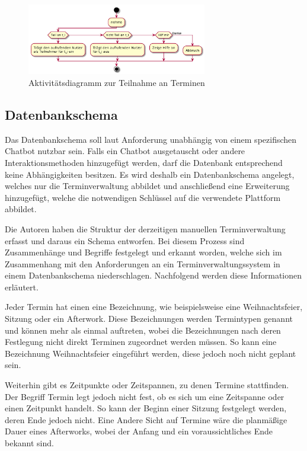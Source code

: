 \begin{figure}[htbp]
    \centering
    \includegraphics[width=0.7\textwidth]{../docs/uml/activity-teilnahme.png}
    \caption{Aktivitätsdiagramm zur Teilnahme an Terminen}
    \label{img:activity-teilnahme}
\end{figure}


\subsection{Datenbankschema}

Das Datenbankschema soll laut Anforderung unabhängig von einem spezifischen Chatbot nutzbar sein. Falls ein Chatbot ausgetauscht oder andere Interaktionsmethoden hinzugefügt werden, darf die Datenbank entsprechend keine Abhängigkeiten besitzen. Es wird deshalb ein Datenbankschema angelegt, welches nur die Terminverwaltung abbildet und anschließend eine Erweiterung hinzugefügt, welche die notwendigen Schlüssel auf die verwendete Plattform abbildet.

Die Autoren haben die Struktur der derzeitigen manuellen Terminverwaltung erfasst und daraus ein Schema entworfen. Bei diesem Prozess sind Zusammenhänge und Begriffe festgelegt und erkannt worden, welche sich im Zusammenhang mit den Anforderungen an ein Terminverwaltungssystem in einem Datenbankschema niederschlagen. Nachfolgend werden diese Informationen erläutert.

Jeder Termin hat einen eine Bezeichnung, wie beispielsweise eine Weihnachtsfeier, Sitzung oder ein Afterwork. Diese Bezeichnungen werden Termintypen genannt und können mehr als einmal auftreten, wobei die Bezeichnungen nach deren Festlegung nicht direkt Terminen zugeordnet werden müssen. So kann eine Bezeichnung Weihnachtsfeier eingeführt werden, diese jedoch noch nicht geplant sein.

Weiterhin gibt es Zeitpunkte oder Zeitspannen, zu denen Termine stattfinden. Der Begriff Termin legt jedoch nicht fest, ob es sich um eine Zeitspanne oder einen Zeitpunkt handelt. So kann der Beginn einer Sitzung festgelegt werden, deren Ende jedoch nicht. Eine Andere Sicht auf Termine wäre die planmäßige Dauer eines Afterworks, wobei der Anfang und ein voraussichtliches Ende bekannt sind.

